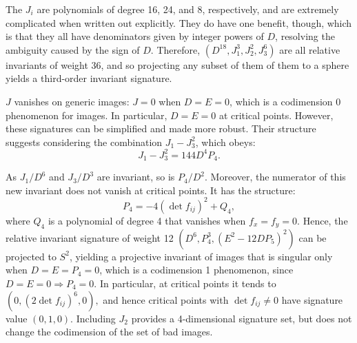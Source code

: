 \documentclass[review,onefignum,onetabnum]{siamonline190516}
\begin{document}
The $J_i$ are polynomials of degree 16, 24, and 8, respectively, and are extremely complicated when written out explicitly. They do have one benefit, though, which is that they  all have denominators given by integer powers of $D$, resolving the ambiguity caused by the sign of $D$. Therefore, $ (D^{18}, J_1^3, J_2^2, J_3^6)$ are all relative invariants of weight 36, and so projecting any subset of them of them to a sphere yields a third-order invariant signature.

$J$ vanishes on generic images: $J=0$ when $D=E=0$, which is a codimension 0 phenomenon for images. In particular, $D=E=0$ at critical points. However, these signatures can be simplified and made more robust. Their structure suggests considering the combination $J_1 - J_3^2$, which obeys:
$$J_1 - J_3^2 = 144 D^4 P_4.$$

As $J_1/D^6$ and $J_3/D^3$ are invariant, so is $P_4/D^2$. 
Moreover, the numerator of this new invariant does not vanish at critical points.  It has the structure:
$$P_4 = -4(\det f_{ij})^2 + Q_4,$$
where $Q_4$ is a polynomial of degree 4 that vanishes when $f_x=f_y=0$. Hence, the relative invariant signature of weight 12 $ (D^6, P_4^3, (E^2-12D P_5)^2)$ can be projected to $S^2$, yielding a projective invariant of images that is singular only when $D=E=P_4=0$, which is a codimension 1 phenomenon, since  $D=E=0\Rightarrow P_4=0$. In particular, at critical points it tends to $(0, (2\det f_{ij})^6, 0),$ and hence critical points with $\det f_{ij}\ne 0$ have signature value $(0,1,0)$.
Including $J_2$ provides a 4-dimensional signature set, but does not change the codimension of the set of bad images.


 
 
\end{document}
